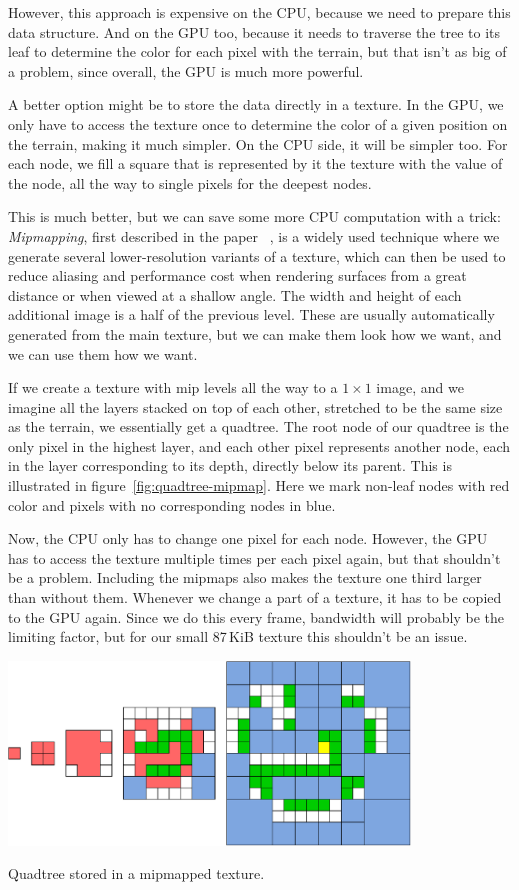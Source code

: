 However, this approach is expensive on the CPU, because we need to prepare this data structure.
And on the GPU too, because it needs to traverse the tree to its leaf to determine the color for each pixel with the terrain, but that isn't as big of a problem, since overall, the GPU is much more powerful.

A better option might be to store the data directly in a texture.
In the GPU, we only have to access the texture once to determine the color of a given position on the terrain, making it much simpler.
On the CPU side, it will be simpler too.
For each node, we fill a square that is represented by it the texture with the value of the node, all the way to single pixels for the deepest nodes.

This is much better, but we can save some more CPU computation with a trick:
\emph{Mipmapping}, first described in the paper ~\cite{Mipmaps}, is a widely used technique where we generate several lower-resolution variants of a texture, which can then be used to reduce aliasing and performance cost when rendering surfaces from a great distance or when viewed at a shallow angle.
The width and height of each additional image is a half of the previous level.
These are usually automatically generated from the main texture, but we can make them look how we want, and we can use them how we want.

If we create a texture with mip levels all the way to a $1 \times 1$ image, and we imagine all the layers stacked on top of each other, stretched to be the same size as the terrain, we essentially get a quadtree.
The root node of our quadtree is the only pixel in the highest layer, and each other pixel represents another node, each in the layer corresponding to its depth, directly below its parent.
This is illustrated in figure~\ref{fig:quadtree-mipmap}.
Here we mark non-leaf nodes with red color and pixels with no corresponding nodes in blue.

Now, the CPU only has to change one pixel for each node.
However, the GPU has to access the texture multiple times per each pixel again, but that shouldn't be a problem.
Including the mipmaps also makes the texture one third larger than without them.
Whenever we change a part of a texture, it has to be copied to the GPU again.
Since we do this every frame, bandwidth will probably be the limiting factor, but for our small 87\,KiB texture this shouldn't be an issue.

\begin{center}
    \captionsetup{type=figure}
    \includegraphics[width=0.8\textwidth]{img/quadtree mipmaps.pdf}
    \caption{Quadtree stored in a mipmapped texture.}
    \label{fig:quadtree-mipmap}
\end{center}

